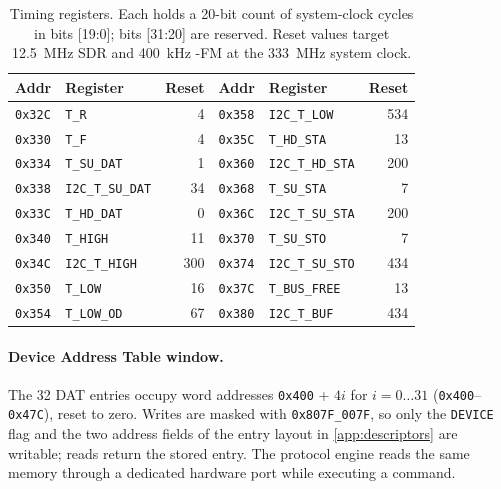 \begin{table}[!htb]\centering
  \caption{Timing registers. Each holds a 20-bit count of system-clock cycles in bits
    [19:0]; bits [31:20] are reserved. Reset values target \SI{12.5}{\mega\hertz} SDR and
    \SI{400}{\kilo\hertz} \iic{}-FM at the \SI{333}{\mega\hertz} system clock.}
  \label{tab:app-csr-timing}
  \small
  \begin{tabular}{@{}llr@{\hspace{2.5em}}llr@{}}
    \toprule
    \textbf{Addr} & \textbf{Register} & \textbf{Reset} &
    \textbf{Addr} & \textbf{Register} & \textbf{Reset} \\
    \midrule
    \texttt{0x32C} & \texttt{T\_R}          & 4  & \texttt{0x358} & \texttt{I2C\_T\_LOW}    & 534 \\
    \texttt{0x330} & \texttt{T\_F}          & 4  & \texttt{0x35C} & \texttt{T\_HD\_STA}     & 13 \\
    \texttt{0x334} & \texttt{T\_SU\_DAT}    & 1  & \texttt{0x360} & \texttt{I2C\_T\_HD\_STA} & 200 \\
    \texttt{0x338} & \texttt{I2C\_T\_SU\_DAT} & 34 & \texttt{0x368} & \texttt{T\_SU\_STA}   & 7 \\
    \texttt{0x33C} & \texttt{T\_HD\_DAT}    & 0  & \texttt{0x36C} & \texttt{I2C\_T\_SU\_STA} & 200 \\
    \texttt{0x340} & \texttt{T\_HIGH}       & 11 & \texttt{0x370} & \texttt{T\_SU\_STO}     & 7 \\
    \texttt{0x34C} & \texttt{I2C\_T\_HIGH}  & 300 & \texttt{0x374} & \texttt{I2C\_T\_SU\_STO} & 434 \\
    \texttt{0x350} & \texttt{T\_LOW}        & 16 & \texttt{0x37C} & \texttt{T\_BUS\_FREE}   & 13 \\
    \texttt{0x354} & \texttt{T\_LOW\_OD}    & 67 & \texttt{0x380} & \texttt{I2C\_T\_BUF}    & 434 \\
    \bottomrule
  \end{tabular}
\end{table}

\paragraph{Device Address Table window.} The 32 DAT entries occupy word addresses
\texttt{0x400} + $4i$ for $i = 0 \ldots 31$ (\texttt{0x400}--\texttt{0x47C}), reset to zero.
Writes are masked with \texttt{0x807F\_007F}, so only the \texttt{DEVICE} flag and the two
address fields of the entry layout in \cref{app:descriptors} are writable; reads return the
stored entry. The protocol engine reads the same memory through a dedicated hardware port
while executing a command.

